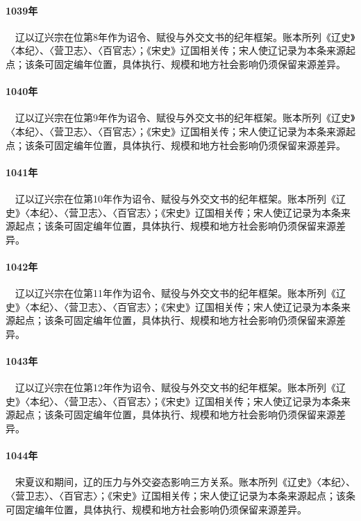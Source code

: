 \paragraph{1039年}　辽以辽兴宗在位第8年作为诏令、赋役与外交文书的纪年框架。账本所列《辽史》〈本纪〉、〈营卫志〉、〈百官志〉；《宋史》辽国相关传；宋人使辽记录为本条来源起点；该条可固定编年位置，具体执行、规模和地方社会影响仍须保留来源差异。

\paragraph{1040年}　辽以辽兴宗在位第9年作为诏令、赋役与外交文书的纪年框架。账本所列《辽史》〈本纪〉、〈营卫志〉、〈百官志〉；《宋史》辽国相关传；宋人使辽记录为本条来源起点；该条可固定编年位置，具体执行、规模和地方社会影响仍须保留来源差异。

\paragraph{1041年}　辽以辽兴宗在位第10年作为诏令、赋役与外交文书的纪年框架。账本所列《辽史》〈本纪〉、〈营卫志〉、〈百官志〉；《宋史》辽国相关传；宋人使辽记录为本条来源起点；该条可固定编年位置，具体执行、规模和地方社会影响仍须保留来源差异。

\paragraph{1042年}　辽以辽兴宗在位第11年作为诏令、赋役与外交文书的纪年框架。账本所列《辽史》〈本纪〉、〈营卫志〉、〈百官志〉；《宋史》辽国相关传；宋人使辽记录为本条来源起点；该条可固定编年位置，具体执行、规模和地方社会影响仍须保留来源差异。

\paragraph{1043年}　辽以辽兴宗在位第12年作为诏令、赋役与外交文书的纪年框架。账本所列《辽史》〈本纪〉、〈营卫志〉、〈百官志〉；《宋史》辽国相关传；宋人使辽记录为本条来源起点；该条可固定编年位置，具体执行、规模和地方社会影响仍须保留来源差异。

\paragraph{1044年}　宋夏议和期间，辽的压力与外交姿态影响三方关系。账本所列《辽史》〈本纪〉、〈营卫志〉、〈百官志〉；《宋史》辽国相关传；宋人使辽记录为本条来源起点；该条可固定编年位置，具体执行、规模和地方社会影响仍须保留来源差异。

